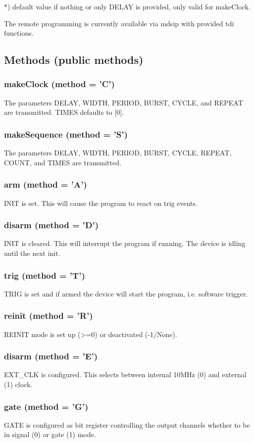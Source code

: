 \documentclass{article}
\begin{document}
*) default value if nothing or only DELAY is provided, only valid for makeClock.

The remote programming is currently available via mdsip with provided tdi functions.

\subsection*{Methods (public methods)}
\subsubsection*{makeClock (method = 'C')}
The parameters DELAY, WIDTH, PERIOD, BURST, CYCLE, and REPEAT are transmitted. TIMES defaults to [0].
\subsubsection*{makeSequence (method = 'S')}
The parameters DELAY, WIDTH, PERIOD, BURST, CYCLE, REPEAT, COUNT, and TIMES are transmitted.
\subsubsection*{arm (method = 'A')}
INIT is set. This will cause the program to react on trig events.
\subsubsection*{disarm (method = 'D')}
INIT is cleared. This will interrupt the program if running. The device is idling until the next init.
\subsubsection*{trig (method = 'T')}
TRIG is set and if armed the device will start the program, i.e. software trigger.
\subsubsection*{reinit (method = 'R')}
REINIT mode is set up (>=0) or deactivated (-1/None).
\subsubsection*{disarm (method = 'E')}
EXT\_CLK is configured. This selects between internal 10MHz (0) and external (1) clock.
\subsubsection*{gate (method = 'G')}
GATE is configured as bit register controlling the output channels whether to be in signal (0) or gate (1) mode.
\end{document}
